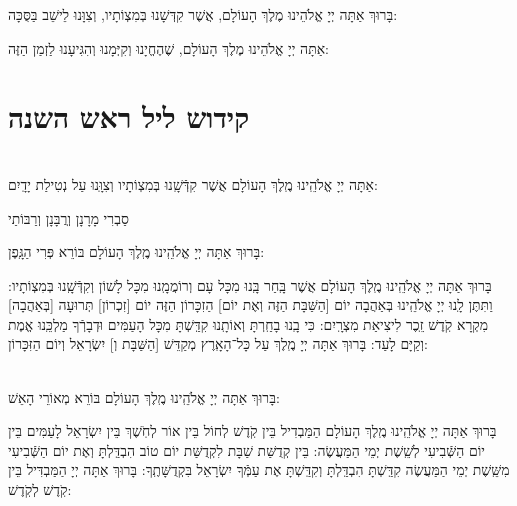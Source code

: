 \documentclass[twoside, openany, parskip=half, 11pt]{book}
\begin{document}
\vspace{-.5\baselineskip}
בָּרוּךְ אַתָּה יְיָ אֱלֹהֵינוּ מֶלֶךְ הָעוֹלָם, אֲשֶׁר קִדְּשָׁנוּ בְּמִצְוֹתָיו, וְצִוָּנוּ לֵישֵׁב בַּסֻּכָּה:

 אַתָּה יְיָ אֱלֹהֵינוּ מֶלֶךְ הָעוֹלָם, שֶׁהֶחֱיָנוּ וְקִיְּמָנוּ וְהִגִּיעָנוּ לַזְמַן הַזֶּה:


\vspace{\baselineskip}
{\let\clearpage\relax 
\chapter[קידוש ליל ראש השנה]{ קידוש ליל ראש השנה }}

\\
 אַתָּה יְיָ אֱלֹהֵֽינוּ מֶֽלֶךְ הָעוֹלָם אֲשֶׁר קִדְּֿשָֽׁנוּ בְּמִצְוֹתָיו וְצִוָּֽנוּ עַל נְטִילַת יָדָֽיִם: 

\begin{footnotesize}
סַבְרִי מָרָנָן וְרֲבָּנָן וְרַבּוֹתַי\\
\end{footnotesize}
בָּרוּךְ אַתָּה יְיָ אֱלֹהֵֽינוּ מֶֽלֶךְ הָעוֹלָם בּוֹרֵא פְּרִי הַגָּֽפֶן:

בָּרוּךְ אַתָּה יְיָ אֱלֹהֵֽינוּ מֶֽלֶךְ הָעוֹלָם אֲשֶׁר בָּֽחַר בָּֽנוּ מִכָּל עָם וְרוֹמֲמָֽנוּ מִכָּל לָשׁוֹן וְקִדְּֿשָֽׁנוּ בְּמִצְוֹתָיו: וַתִּתֶּן לָֽנוּ יְיָ אֱלֹהֵֽינוּ בְּאַהֲבָה יוֹם [הַשַּׁבָּת הַזֶּה וְאֶת יוֹם]  הַזִכָּרוֹן הַזֶּה יוֹם [זִכְרוֹן] תְּרוּעָה [בְּאַהֲבָה] מִקְרָא קֹֽדֶשׁ זֵֽכֶר לִיצִיאַת מִצְרָֽיִם: כִּי בָֽנוּ בָחַֽרְתָּ וְאוֹתָֽנוּ קִדַּֽשְׁתָּ מִכָּל הָעַמִּים וּדְבָרְֿךָ מַלְכֵּֽנוּ אֱמֶת וְקַיָּם לָעַד: בָּרוּךְ אַתָּה יְיָ מֶֽלֶךְ עַל כָּל־הָאָֽרֶץ מְקַדֵּשׁ [הַשַּׁבָּת וְ] יִשְׂרָאֵל וְיוֹם הַזִּכָּרוֹן:



\begin{sometimes}

\\
בָּרוּךְ אַתָּה יְיָ אֱלֹהֵֽינוּ מֶֽלֶךְ הָעוֹלָם בּוֹרֵא מְאוֹרֵי הָאֵשׁ:

בָּרוּךְ אַתָּה יְיָ אֱלֹהֵֽינוּ מֶֽלֶךְ הָעוֹלָם הַמַּבְדִיל בֵּין קֹֽדֶשׁ לְחוֹל בֵּין אוֹר לְחֹֽשֶׁךְ בֵּין יִשְׂרָאֵל לָעַמִּים בֵּין יוֹם הַשְּֿׁבִיעִי לְשֵֽׁשֶׁת יְמֵי הַמַּעֲשֶׂה: בֵּין קְדֻשַּׁת שַׁבָּת לִקְדֻשַּׁת יוֹם טוֹב הִבְדַּֽלְתָּ וְאֶת יוֹם הַשְּֿׁבִיעִי מִשֵּֽׁשֶׁת יְמֵי הַמַּעֲשֶׂה קִדַּֽשְׁתָּ הִבְדַּֽלְתָּ וְקִדַּֽשְׁתָּ אֶת עַמְּֿךָ יִשְׂרָאֵל בִּקְדֻשָּׁתֶֽךָ: בָּרוּךְ אַתָּה יְיָ הַמַּבְדִּיל בֵּין קֹֽדֶשׁ לְקֹֽדֶשׁ:

\end{sometimes}
\end{document}
